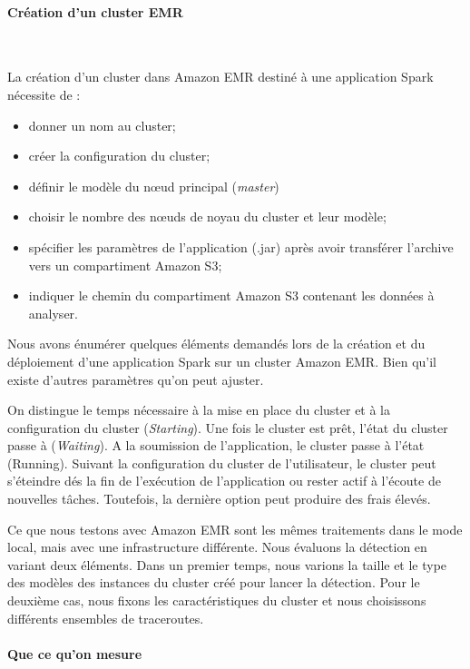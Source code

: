 \paragraph{Création d'un cluster EMR}~

La création d'un cluster dans Amazon EMR destiné à une application Spark nécessite de  :
\begin{itemize}
	\item donner un nom au cluster;
	\item créer la configuration du cluster;
	\item définir le modèle du n\oe{}ud principal (\textit{master}) 
	\item choisir le nombre des n\oe{}uds de noyau  du cluster et leur modèle;
	\item spécifier les paramètres de l'application  (.jar) après avoir transférer l'archive vers  un compartiment Amazon S3;
	\item indiquer le chemin du compartiment Amazon S3 contenant  les données à analyser.
\end{itemize}

Nous avons énumérer quelques éléments demandés lors de la création et du déploiement d'une application Spark sur un cluster Amazon EMR. Bien  qu'il existe d'autres paramètres qu'on peut ajuster. 

On distingue le temps nécessaire à la mise en place du cluster et à la configuration du cluster (\textit{Starting}). Une fois le cluster est prêt, l'état du cluster passe à (\textit{Waiting}).  A la soumission de l'application, le cluster passe à l'état (Running). Suivant la configuration du cluster de l'utilisateur, le cluster peut s'éteindre dés la fin de l'exécution de l'application ou rester actif à l'écoute de nouvelles tâches. Toutefois, la dernière option peut produire des frais élevés.  


Ce que nous testons avec Amazon EMR sont les mêmes traitements dans le mode local, mais avec une infrastructure différente. Nous évaluons la détection en variant deux éléments. Dans un premier temps, nous varions la taille et le type des modèles des instances du cluster créé pour lancer la détection. Pour le deuxième cas, nous fixons les caractéristiques du cluster et  nous choisissons différents ensembles de traceroutes. 


\paragraph{Que ce qu'on mesure}~



